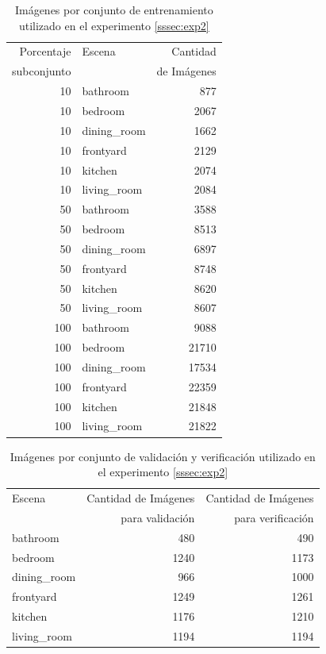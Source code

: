 \begin{table}[h!]
	\centering
	\begin{tabular}{| r | l | r |}
		\toprule
		Porcentaje & Escena &  Cantidad \\
		subconjunto & {} &  de Imágenes \\
		\midrule
		10 &     bathroom &       877 \\
		10 &      bedroom &      2067 \\
		10 &  dining\_room &      1662 \\
		10 &    frontyard &      2129 \\
		10 &      kitchen &      2074 \\
		10 &  living\_room &      2084 \\
		\midrule
		50 &     bathroom &      3588 \\
		50 &      bedroom &      8513 \\
		50 &  dining\_room &      6897 \\
		50 &    frontyard &      8748 \\
		50 &      kitchen &      8620 \\
		50 &  living\_room &      8607 \\
		\midrule
		100 &     bathroom &      9088 \\
		100 &      bedroom &     21710 \\
		100 &  dining\_room &     17534 \\
		100 &    frontyard &     22359 \\
		100 &      kitchen &     21848 \\
		100 &  living\_room &     21822 \\
		\bottomrule
	\end{tabular}
	\caption{Imágenes por conjunto de entrenamiento utilizado en el experimento \ref{sssec:exp2}}
	\label{exp2:distribucion_clase_datasets}
\end{table}


\begin{table}[h!]
	\centering
	\begin{tabular}{| l | r | r |}
		\toprule
		Escena &  Cantidad de Imágenes &  Cantidad de Imágenes \\
		{} & para validación & para verificación \\
		\midrule
		bathroom &             480 &            490 \\
		bedroom &            1240 &           1173 \\
		dining\_room &             966 &           1000 \\
		frontyard &            1249 &           1261 \\
		kitchen &            1176 &           1210 \\
		living\_room &            1194 &           1194 \\
		\bottomrule
	\end{tabular}
	\caption{Imágenes por conjunto de validación y verificación utilizado en el experimento \ref{sssec:exp2}}
	\label{exp2:distribucion_clase_datasets_validation_test}
\end{table}


